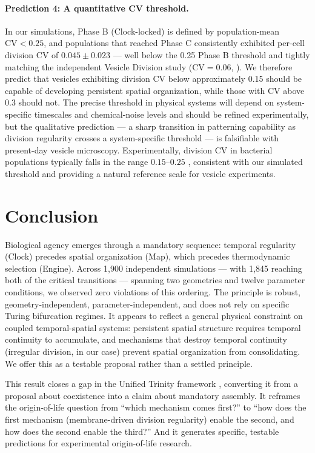 \documentclass[11pt,letterpaper]{article}
\begin{document}
\paragraph{Prediction 4: A quantitative CV threshold.} In our simulations, Phase B (Clock-locked) is defined by population-mean $\mathrm{CV} < 0.25$, and populations that reached Phase C consistently exhibited per-cell division CV of $0.045 \pm 0.023$ --- well below the 0.25 Phase B threshold and tightly matching the independent Vesicle Division study ($\mathrm{CV} = 0.06$, \citealt{farina2025vesicle}). We therefore predict that vesicles exhibiting division CV below approximately 0.15 should be capable of developing persistent spatial organization, while those with CV above 0.3 should not. The precise threshold in physical systems will depend on system-specific timescales and chemical-noise levels and should be refined experimentally, but the qualitative prediction --- a sharp transition in patterning capability as division regularity crosses a system-specific threshold --- is falsifiable with present-day vesicle microscopy. Experimentally, division CV in bacterial populations typically falls in the range $0.15$--$0.25$ \citep{stewart2005aging,taheriaraghi2015cellsize}, consistent with our simulated threshold and providing a natural reference scale for vesicle experiments.

\section{Conclusion}

Biological agency emerges through a mandatory sequence: temporal regularity (Clock) precedes spatial organization (Map), which precedes thermodynamic selection (Engine). Across 1{,}900 independent simulations --- with 1{,}845 reaching both of the critical transitions --- spanning two geometries and twelve parameter conditions, we observed zero violations of this ordering. The principle is robust, geometry-independent, parameter-independent, and does not rely on specific Turing bifurcation regimes. It appears to reflect a general physical constraint on coupled temporal-spatial systems: persistent spatial structure requires temporal continuity to accumulate, and mechanisms that destroy temporal continuity (irregular division, in our case) prevent spatial organization from consolidating. We offer this as a testable proposal rather than a settled principle.

This result closes a gap in the Unified Trinity framework \citep{farina2025trinity}, converting it from a proposal about coexistence into a claim about mandatory assembly. It reframes the origin-of-life question from ``which mechanism comes first?'' to ``how does the first mechanism (membrane-driven division regularity) enable the second, and how does the second enable the third?'' And it generates specific, testable predictions for experimental origin-of-life research.
\end{document}
